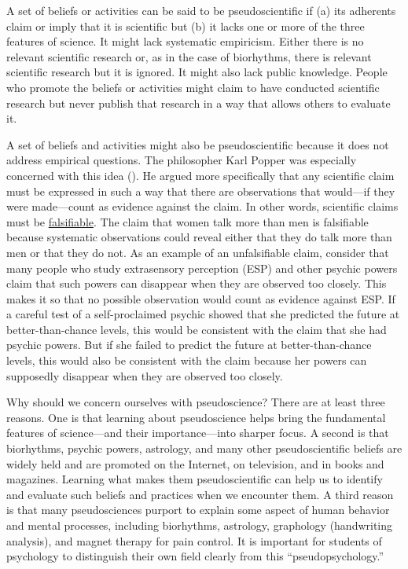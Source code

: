 \documentclass[
]{krantz}
\begin{document}
A set of beliefs or activities can be said to be pseudoscientific if (a) its adherents claim or imply that it is scientific but (b) it lacks one or more of the three features of science. It might lack systematic empiricism. Either there is no relevant scientific research or, as in the case of biorhythms, there is relevant scientific research but it is ignored. It might also lack public knowledge. People who promote the beliefs or activities might claim to have conducted scientific research but never publish that research in a way that allows others to evaluate it.

A set of beliefs and activities might also be pseudoscientific because it does not address empirical questions. The philosopher Karl Popper was especially concerned with this idea (). He argued more specifically that any scientific claim must be expressed in such a way that there are observations that would---if they were made---count as evidence against the claim. In other words, scientific claims must be \hyperref[falsifiable]{falsifiable}. The claim that women talk more than men is falsifiable because systematic observations could reveal either that they do talk more than men or that they do not. As an example of an unfalsifiable claim, consider that many people who study extrasensory perception (ESP) and other psychic powers claim that such powers can disappear when they are observed too closely. This makes it so that no possible observation would count as evidence against ESP. If a careful test of a self-proclaimed psychic showed that she predicted the future at better-than-chance levels, this would be consistent with the claim that she had psychic powers. But if she failed to predict the future at better-than-chance levels, this would also be consistent with the claim because her powers can supposedly disappear when they are observed too closely.

Why should we concern ourselves with pseudoscience? There are at least three reasons. One is that learning about pseudoscience helps bring the fundamental features of science---and their importance---into sharper focus. A second is that biorhythms, psychic powers, astrology, and many other pseudoscientific beliefs are widely held and are promoted on the Internet, on television, and in books and magazines. Learning what makes them pseudoscientific can help us to identify and evaluate such beliefs and practices when we encounter them. A third reason is that many pseudosciences purport to explain some aspect of human behavior and mental processes, including biorhythms, astrology, graphology (handwriting analysis), and magnet therapy for pain control. It is important for students of psychology to distinguish their own field clearly from this ``pseudopsychology.''
\end{document}
